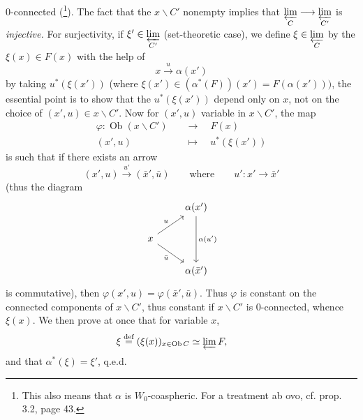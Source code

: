 0-connected (\footnote[4]{This also means that $\alpha$ is $W_0$-coaspheric. For a treatment ab ovo, cf. prop. 3.2, page 43.}). The fact that the $x\backslash C'$ nonempty implies that $\varprojlim\limits_{C} \longrightarrow \varprojlim\limits_{C'}$ is \textit{injective.} For surjectivity, if $\xi' \in \varprojlim\limits_{C'}$ (set-theoretic case), we define $\xi \in \varprojlim\limits_{C}$ by the $\xi(x) \in F(x)$ with the help of %
\[ x \xrightarrow{u} \alpha(x') \]
by taking $u^*(\xi(x'))$ (where $\xi(x') \in (\alpha^*(F))(x') = F(\alpha(x')))$, the essential point is to show that the $u^*(\xi(x'))$ depend only on $x$, not on the choice of $(x',u) \in x\backslash C'$. Now for $(x',u)$ variable in $x\backslash C'$, the map
\[
\begin{aligned}
\varphi : \operatorname{Ob}(x\backslash C') &\quad\longrightarrow\quad F(x)\\
(x',u) &\quad\longmapsto\quad u^*(\xi(x'))
\end{aligned}
\]
is such that if there exists an arrow
\[ (x',u) \xrightarrow{u'} (\bar{x}',\bar{u}) \qquad \text{where} \qquad u' : x' \longrightarrow \bar{x}' \]
(thus the diagram
\[
\begin{tikzcd}
 & \alpha(x') \arrow[dd, "\alpha(u')"] \\
x \arrow[ur, "u"] \arrow[dr, "\bar{u}"'] & \\
 & \alpha(\bar{x}')
\end{tikzcd}
\]
is commutative), then $\varphi(x',u) = \varphi(\bar{x}',\bar{u})$. Thus $\varphi$ is constant on the connected components of $x\backslash C'$, thus constant if $x\backslash C'$ is 0-connected, whence $\xi(x)$. We then prove at once that for variable $x$,
\[ \xi \overset{\text{def}}{=} (\xi(x))_{x\in\operatorname{Ob} C} \simeq \varprojlim F, \qquad \]
and that $\alpha^*(\xi) = \xi'$, q.e.d.

